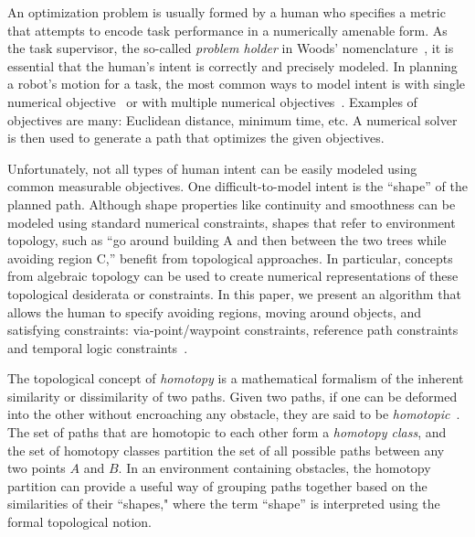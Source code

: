 \documentclass[letterpaper, 10 pt, conference]{ieeeconf}
\begin{document}
An optimization problem is usually formed by a human who specifies a metric that attempts to encode task performance in a numerically amenable form.
As the task supervisor, the so-called {\em problem holder} in Woods' nomenclature~\cite{woods2004envisioning}, it is essential that the human's intent is correctly and precisely modeled.
In planning a robot's motion for a task, the most common ways to model intent is with single numerical objective~\cite{6974170} or with multiple numerical objectives~\cite{yi2014supporting}.  Examples of objectives are many: Euclidean distance, minimum time, etc.
A numerical solver is then used to generate a path that optimizes the given objectives.

Unfortunately, not all types of human intent can be easily modeled using common measurable objectives.
One difficult-to-model intent is the ``shape'' of the planned path.  Although shape properties like continuity and smoothness can be modeled using standard numerical constraints, shapes that refer to environment topology, such as ``go around building A and then between the two trees while avoiding region C,'' benefit from topological approaches.  In particular, concepts from algebraic topology can be used to create numerical representations of these topological desiderata or constraints.  In this paper, we present an algorithm that allows the human to specify avoiding regions, moving around objects, and satisfying constraints: via-point/waypoint constraints, reference path constraints~\cite{6974170} and temporal logic constraints~\cite{5650896}.

The topological concept of \emph{homotopy} is a mathematical formalism of the inherent similarity or dissimilarity of two paths.
Given two paths, if one can be deformed into the other without encroaching any obstacle, they are said to be \emph{homotopic}~\cite{Hernandez201544}.
The set of paths that are homotopic to each other form a \emph{homotopy class}, and the  set of homotopy classes partition the set of all possible paths between any two points $A$ and $B$.
In an environment containing obstacles, the homotopy partition can provide a useful way of grouping paths together based on the similarities of their ``shapes," where the term ``shape'' is interpreted using the formal topological notion.
\end{document}
